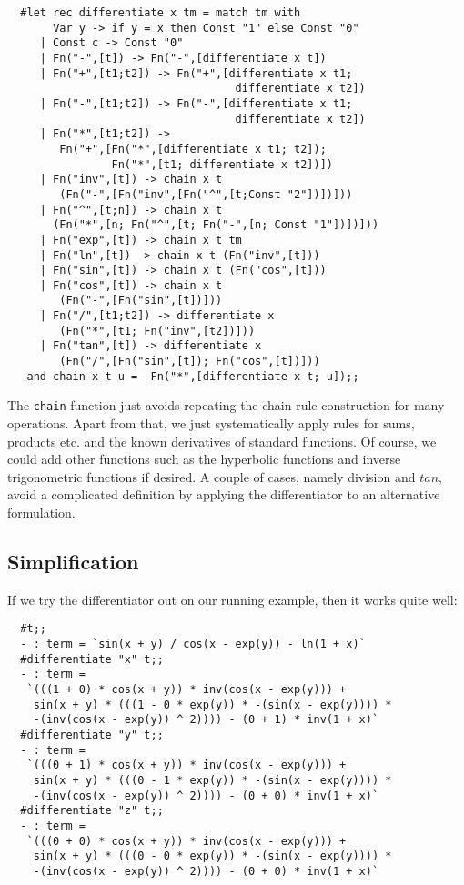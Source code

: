 \begin{boxed}\begin{verbatim}
  #let rec differentiate x tm = match tm with
       Var y -> if y = x then Const "1" else Const "0"
     | Const c -> Const "0"
     | Fn("-",[t]) -> Fn("-",[differentiate x t])
     | Fn("+",[t1;t2]) -> Fn("+",[differentiate x t1;
                                   differentiate x t2])
     | Fn("-",[t1;t2]) -> Fn("-",[differentiate x t1;
                                   differentiate x t2])
     | Fn("*",[t1;t2]) ->
        Fn("+",[Fn("*",[differentiate x t1; t2]);
                Fn("*",[t1; differentiate x t2])])
     | Fn("inv",[t]) -> chain x t
        (Fn("-",[Fn("inv",[Fn("^",[t;Const "2"])])]))
     | Fn("^",[t;n]) -> chain x t
       (Fn("*",[n; Fn("^",[t; Fn("-",[n; Const "1"])])]))
     | Fn("exp",[t]) -> chain x t tm
     | Fn("ln",[t]) -> chain x t (Fn("inv",[t]))
     | Fn("sin",[t]) -> chain x t (Fn("cos",[t]))
     | Fn("cos",[t]) -> chain x t
        (Fn("-",[Fn("sin",[t])]))
     | Fn("/",[t1;t2]) -> differentiate x
        (Fn("*",[t1; Fn("inv",[t2])]))
     | Fn("tan",[t]) -> differentiate x
        (Fn("/",[Fn("sin",[t]); Fn("cos",[t])]))
   and chain x t u =  Fn("*",[differentiate x t; u]);;
\end{verbatim}\end{boxed}

The {\tt chain} function just avoids repeating the chain rule construction for
many operations. Apart from that, we just systematically apply rules for sums,
products etc. and the known derivatives of standard functions. Of course, we
could add other functions such as the hyperbolic functions and inverse
trigonometric functions if desired. A couple of cases, namely division and
$tan$, avoid a complicated definition by applying the differentiator to an
alternative formulation.

\subsection{Simplification}

If we try the differentiator out on our running example, then it works quite
well:

\begin{boxed}\begin{verbatim}
  #t;;
  - : term = `sin(x + y) / cos(x - exp(y)) - ln(1 + x)`
  #differentiate "x" t;;
  - : term =
   `(((1 + 0) * cos(x + y)) * inv(cos(x - exp(y))) +
    sin(x + y) * (((1 - 0 * exp(y)) * -(sin(x - exp(y)))) *
    -(inv(cos(x - exp(y)) ^ 2)))) - (0 + 1) * inv(1 + x)`
  #differentiate "y" t;;
  - : term =
   `(((0 + 1) * cos(x + y)) * inv(cos(x - exp(y))) +
    sin(x + y) * (((0 - 1 * exp(y)) * -(sin(x - exp(y)))) *
    -(inv(cos(x - exp(y)) ^ 2)))) - (0 + 0) * inv(1 + x)`
  #differentiate "z" t;;
  - : term =
   `(((0 + 0) * cos(x + y)) * inv(cos(x - exp(y))) +
    sin(x + y) * (((0 - 0 * exp(y)) * -(sin(x - exp(y)))) *
    -(inv(cos(x - exp(y)) ^ 2)))) - (0 + 0) * inv(1 + x)`
\end{verbatim}\end{boxed}

